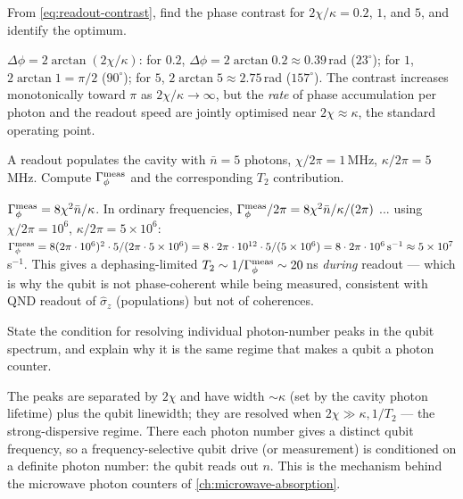\begin{exercise}
From \cref{eq:readout-contrast}, find the phase contrast for
$2\chi/\kappa=0.2$, $1$, and $5$, and identify the optimum.
\begin{solution}
$\Delta\phi=2\arctan(2\chi/\kappa)$: for $0.2$,
$\Delta\phi=2\arctan0.2\approx0.39\,$rad ($23^\circ$); for $1$,
$2\arctan1=\pi/2$ ($90^\circ$); for $5$,
$2\arctan5\approx2.75\,$rad ($157^\circ$). The contrast increases
monotonically toward $\pi$ as $2\chi/\kappa\to\infty$, but the
\emph{rate} of phase accumulation per photon and the readout speed
are jointly optimised near $2\chi\approx\kappa$, the standard
operating point.
\end{solution}
\end{exercise}

\begin{exercise}
A readout populates the cavity with $\bar n=5$ photons,
$\chi/2\pi=1\,$MHz, $\kappa/2\pi=5\,$MHz. Compute
$\Gamma_\phi^{\rm meas}$ and the corresponding $T_2$ contribution.
\begin{solution}
$\Gamma_\phi^{\rm meas}=8\chi^2\bar n/\kappa$. In ordinary
frequencies, $\Gamma_\phi^{\rm meas}/2\pi=8\chi^2\bar n/\kappa/(2\pi)$
... using $\chi/2\pi=10^6$, $\kappa/2\pi=5\times10^6$:
$\Gamma_\phi^{\rm meas}=8(2\pi\cdot10^6)^2\cdot5/(2\pi\cdot5\times10^6)
=8\cdot2\pi\cdot10^{12}\cdot5/(5\times10^6)=8\cdot2\pi\cdot10^6\,\text{s}^{-1}\approx5\times10^7\,$s$^{-1}$.
This gives a dephasing-limited $T_2\sim1/\Gamma_\phi^{\rm meas}\sim20\,$ns
\emph{during} readout --- which is why the qubit is not
phase-coherent while being measured, consistent with QND readout of
$\hat\sigma_z$ (populations) but not of coherences.
\end{solution}
\end{exercise}

\begin{exercise}
State the condition for resolving individual photon-number peaks in
the qubit spectrum, and explain why it is the same regime that makes
a qubit a photon counter.
\begin{solution}
The peaks are separated by $2\chi$ and have width $\sim\kappa$ (set
by the cavity photon lifetime) plus the qubit linewidth; they are
resolved when $2\chi\gg\kappa,1/T_2$ --- the strong-dispersive
regime. There each photon number gives a distinct qubit frequency,
so a frequency-selective qubit drive (or measurement) is conditioned
on a definite photon number: the qubit reads out $n$. This is the
mechanism behind the microwave photon counters of
\cref{ch:microwave-absorption}.
\end{solution}
\end{exercise}

